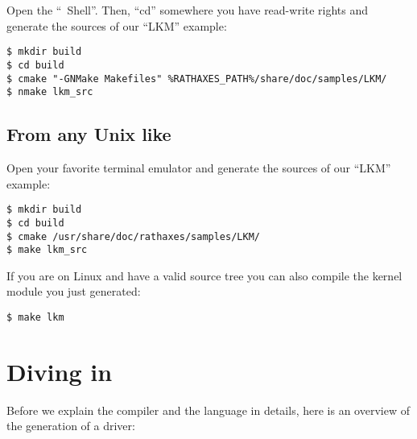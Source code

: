 \documentclass[american]{rtxarticle}
\begin{document}
Open the ``\rtx\ Shell''. Then, ``cd'' somewhere you have read-write rights and
generate the sources of our ``LKM'' example:

\begin{lstlisting}
$ mkdir build
$ cd build
$ cmake "-GNMake Makefiles" %RATHAXES_PATH%/share/doc/samples/LKM/
$ nmake lkm_src
\end{lstlisting}

\subsection{From any Unix like}

Open your favorite terminal emulator and generate the sources of our ``LKM''
example:

\begin{lstlisting}
$ mkdir build
$ cd build
$ cmake /usr/share/doc/rathaxes/samples/LKM/
$ make lkm_src
\end{lstlisting}

If you are on Linux and have a valid source tree you can also compile the kernel
module you just generated:

\begin{lstlisting}
$ make lkm
\end{lstlisting}

\section{Diving in}

Before we explain the compiler and the language in details, here is an overview
of the generation of a driver:
\end{document}
